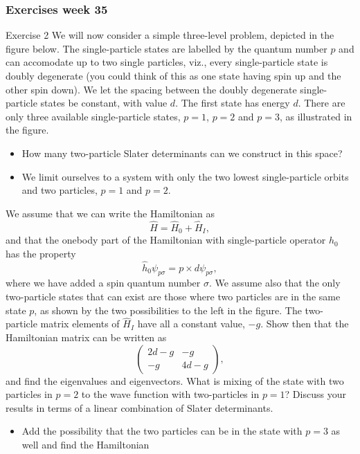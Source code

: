 \documentclass{beamer}
\begin{document}
\begin{frame}
\frametitle{Exercises week 35}

\begin{block}{Exercise 2 }
We will now consider a simple three-level problem, depicted in the figure below. 
The single-particle states are labelled by the quantum number $p$ and can accomodate up to two single particles, 
viz., every single-particle state 
is doubly degenerate (you could think of this as one state having spin up and the other spin down). 
We let the spacing between the doubly degenerate single-particle states be constant, with value $d$.  The first state
has energy $d$. There are only three available single-particle states, $p=1$, $p=2$ and $p=3$, as illustrated
in the figure. 
\begin{itemize}
\item How many two-particle Slater determinants can we construct in this space? 

\item We limit ourselves to a system with only the two lowest single-particle orbits and two particles, $p=1$ and $p=2$.
\end{itemize}

\noindent
We assume that we can write the Hamiltonian as
\[
       \hat{H}=\hat{H}_0+\hat{H}_I,
\]
and that the onebody part of the Hamiltonian with single-particle operator $\hat{h}_0$ has the property
\[
\hat{h}_0\psi_{p\sigma} = p\times d \psi_{p\sigma},
\]
where we have added a spin quantum number $\sigma$. 
We assume also that the only two-particle states that can exist are those where two particles are in the 
same state $p$, as shown by the two possibilities to the left in the figure.
The two-particle matrix elements of $\hat{H}_I$ have all a constant value, $-g$.
Show then that the Hamiltonian matrix can be written as 
\[
\left(\begin{array}{cc}2d-g &-g \\
-g &4d-g \end{array}\right),
\]
and find the eigenvalues and eigenvectors.  What is mixing of the state with two particles in $p=2$ 
to the wave function with two-particles in $p=1$? Discuss your results in terms of a linear combination
of Slater determinants. 
\begin{itemize}
\item Add the possibility that the two particles can be in the state with $p=3$ as well and find the Hamiltonian
\end{itemize}


\end{block}
\end{frame}
\end{document}
